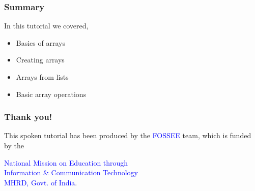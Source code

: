 \documentclass[presentation]{beamer}
\begin{document}
\begin{frame}
\frametitle{Summary}
\label{sec-15}

  In this tutorial we covered,
\begin{itemize}
\item Basics of arrays
\item Creating arrays
\item Arrays from lists
\item Basic array operations
\end{itemize}
\end{frame}
\begin{frame}
\frametitle{Thank you!}
\label{sec-16}

  \begin{block}{}
  \begin{center}
  This spoken tutorial has been produced by the
  \textcolor{blue}{FOSSEE} team, which is funded by the 
  \end{center}
  \begin{center}
    \textcolor{blue}{National Mission on Education through \\
      Information \& Communication Technology \\ 
      MHRD, Govt. of India}.
  \end{center}  
  \end{block}
\end{frame}
\end{document}
